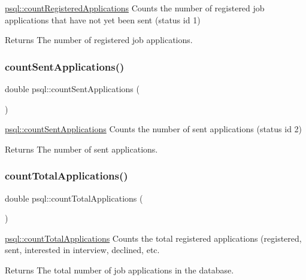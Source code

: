 \mbox{\hyperlink{classpsql_a8673a80968d293cd3ead6e6e9da8dd8a}{psql\+::count\+Registered\+Applications}} Counts the number of registered job applications that have not yet been sent (status id 1) 

\begin{DoxyReturn}{Returns}
The number of registered job applications. 
\end{DoxyReturn}
\mbox{\label{classpsql_af5e6768f6c51ac7b94571505f7a628e4}} 
\subsubsection{\texorpdfstring{count\+Sent\+Applications()}{countSentApplications()}}
{\footnotesize\ttfamily double psql\+::count\+Sent\+Applications (\begin{DoxyParamCaption}{ }\end{DoxyParamCaption})}



\mbox{\hyperlink{classpsql_af5e6768f6c51ac7b94571505f7a628e4}{psql\+::count\+Sent\+Applications}} Counts the number of sent applications (status id 2) 

\begin{DoxyReturn}{Returns}
The number of sent applications. 
\end{DoxyReturn}
\mbox{\label{classpsql_a496d0a426a1539bf9babd1dd4e9fcd96}} 
\subsubsection{\texorpdfstring{count\+Total\+Applications()}{countTotalApplications()}}
{\footnotesize\ttfamily double psql\+::count\+Total\+Applications (\begin{DoxyParamCaption}{ }\end{DoxyParamCaption})}



\mbox{\hyperlink{classpsql_a496d0a426a1539bf9babd1dd4e9fcd96}{psql\+::count\+Total\+Applications}} Counts the total registered applications (registered, sent, interested in interview, declined, etc. 

\begin{DoxyReturn}{Returns}
The total number of job applications in the database. 
\end{DoxyReturn}
\mbox{\label{classpsql_a70ad9f4b00735a55232f46da4edd2edc}} 
